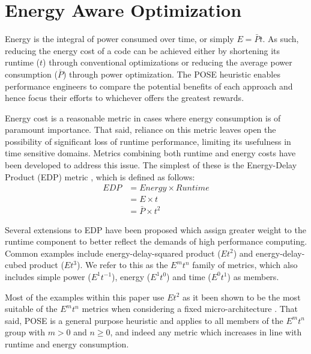 \section{Energy Aware Optimization}
\label{sec:optimization}

Energy is the integral of power consumed over time, or simply $E = \bar{P}t$.
As such, reducing the energy cost of a code can be achieved either by shortening its runtime ($t$) through conventional optimizations or reducing the average power consumption ($\bar{P}$) through power optimization.
The POSE heuristic enables performance engineers to compare the potential benefits of each approach and hence focus their efforts to whichever offers the greatest rewards.

Energy cost is a reasonable metric in cases where energy consumption is of paramount importance.
That said, reliance on this metric leaves open the possibility of significant loss of runtime performance, limiting its usefulness in time sensitive domains.
Metrics combining both runtime and energy costs have been developed to address this issue. 
The simplest of these is the Energy-Delay Product (EDP) metric \cite{gonzales:1995aa}, which is defined as follows:
\begin{align}
  EDP &= Energy \times Runtime \nonumber \\
      &= E \times t \nonumber \\
      &= \bar{P} \times t^2
  \label{eq:edp}
\end{align}

Several extensions to EDP have been proposed which assign greater weight to the runtime component to better reflect the demands of high performance computing.
Common examples include energy-delay-squared product ($Et^{2}$) and energy-delay-cubed product ($Et^{3}$).
We refer to this as the $E^mt^n$ family of metrics, which also includes simple power ($E^1t^{-1}$), energy ($E^1t^0$) and time ($E^0t^1$) as members.

Most of the examples within this paper use $Et^2$ as it been shown to be the most suitable of the $E^mt^n$ metrics when considering a fixed micro-architecture \cite{brooks:2000aa}.
That said, POSE is a general purpose heuristic and applies to all members of the $E^mt^n$ group with $m > 0$ and $n \geq 0$, and indeed any metric which increases in line with runtime and energy consumption.
